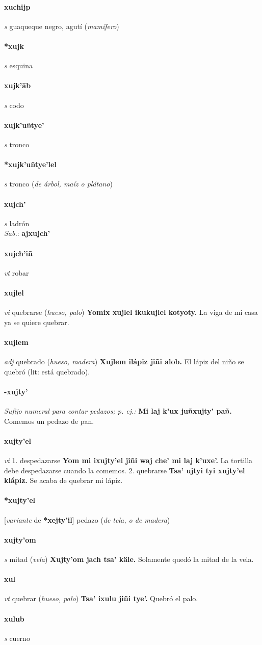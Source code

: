\documentclass{scrbook}
\newcommand{\entry}[1]{\paragraph{#1}}
\newcommand{\onedefinition}[1]{#1.}
\newcommand{\nontranslationdef}[1]{\textit{#1}}
\newcommand{\partofspeech}[1]{\textit{#1}}
\newcommand{\spanishtranslation}[1]{#1}
\newcommand{\clarification}[1]{(\textit{#1})}
\newcommand{\cholexample}[1]{\textbf{#1}}
\newcommand{\exampletranslation}[1]{#1}
\newcommand{\dialectvariant}[1]{\\\textit{#1}:}
\newcommand{\dialectword}[1]{\textbf{#1}}
\newcommand{\conjugationtense}[1]{[\textit{#1}}
\newcommand{\conjugationverb}[1]{de \textbf{#1}]}
\begin{document}
\begin{multicols}{2}
\entry{xuchijp}
\partofspeech{s}
\spanishtranslation{guaqueque negro, agutí}
\clarification{mamífero}

\entry{*xujk}
\partofspeech{s}
\spanishtranslation{esquina}

\entry{xujk'äb}
\partofspeech{s}
\spanishtranslation{codo}

\entry{xujk'uñtye'}
\partofspeech{s}
\spanishtranslation{tronco}

\entry{*xujk'uñtye'lel}
\partofspeech{s}
\spanishtranslation{tronco}
\clarification{de árbol, maíz o plátano}

\entry{xujch'}
\partofspeech{s}
\spanishtranslation{ladrón}
\dialectvariant{Sab.}
\dialectword{ajxujch'}

\entry{xujch'iñ}
\partofspeech{vt}
\spanishtranslation{robar}

\entry{xujlel}
\partofspeech{vi}
\spanishtranslation{quebrarse}
\clarification{hueso, palo}
\cholexample{Yomix xujlel ikukujlel kotyoty.}
\exampletranslation{La viga de mi casa ya se quiere quebrar.}

\entry{xujlem}
\partofspeech{adj}
\spanishtranslation{quebrado}
\clarification{hueso, madera}
\cholexample{Xujlem ilápiz jiñi alob.}
\exampletranslation{El lápiz del niño se quebró (lit: está quebrado).}

\entry{-xujty'}
\nontranslationdef{Sufijo numeral para contar pedazos; p. ej.:}
\cholexample{Mi laj k'ux juñxujty' pañ.}
\exampletranslation{Comemos un pedazo de pan.}

\entry{xujty'el}
\partofspeech{vi}
\onedefinition{1}
\spanishtranslation{despedazarse}
\cholexample{Yom mi ixujty'el jiñi waj che' mi laj k'uxe'.}
\exampletranslation{La tortilla debe despedazarse cuando la comemos.}
\onedefinition{2}
\spanishtranslation{quebrarse}
\cholexample{Tsa' ujtyi tyi xujty'el klápiz.}
\exampletranslation{Se acaba de quebrar mi lápiz.}

\entry{*xujty'el}
\conjugationtense{variante}
\conjugationverb{*xejty'il}
\spanishtranslation{pedazo}
\clarification{de tela, o de madera}

\entry{xujty'om}
\partofspeech{s}
\spanishtranslation{mitad}
\clarification{vela}
\cholexample{Xujty'om jach tsa' käle.}
\exampletranslation{Solamente quedó la mitad de la vela.}

\entry{xul}
\partofspeech{vt}
\spanishtranslation{quebrar}
\clarification{hueso, palo}
\cholexample{Tsa' ixulu jiñi tye'.}
\exampletranslation{Quebró el palo.}

\entry{xulub}
\partofspeech{s}
\spanishtranslation{cuerno}


\end{multicols}
\end{document}
